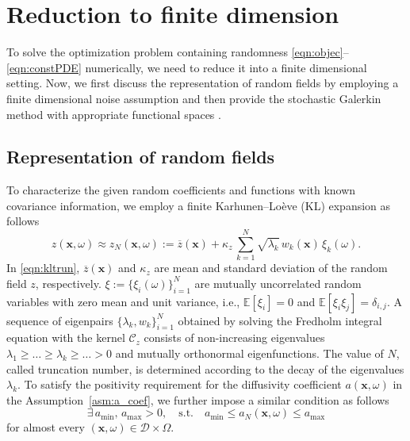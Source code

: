 \documentclass[a4paper,10pt]{article}
\numberwithin{theorem}{section}
\begin{document}


\section{Reduction to finite dimension}\label{sec:finite_dimension} 

To solve the optimization problem containing randomness \eqref{eqn:objec}--\eqref{eqn:constPDE} numerically, we need to reduce it into a finite dimensional setting. Now, we first discuss the representation of random fields by employing a finite dimensional noise assumption \cite{NWiener_1938a} and then provide  the stochastic Galerkin method with  appropriate functional spaces \cite{IBabuska_RTempone_GEZouraris_2004a}.

\subsection{Representation of random fields}

To characterize the given random coefficients and functions with known covariance information, we employ a finite Karhunen--Lo\`{e}ve (KL) expansion \cite{KKarhunen_1947,MLoeve_1946} as follows 
\begin{equation}\label{eqn:kltrun}
	z(\boldsymbol{x},\omega) \approx z_{N}(\boldsymbol{x},\omega) := \overline{z}(\boldsymbol{x}) + \kappa_{z} \,\sum \limits_{k=1}^{N} \sqrt{\lambda_k}\,w_k(\boldsymbol{x})\,\xi_k(\omega).
\end{equation}
In \eqref{eqn:kltrun}, $\overline{z}(\boldsymbol{x})$ and $\kappa_{z}$ are   mean and standard deviation of the random field $z$, respectively. $\xi:=\{\xi_i(\omega)\}_{i=1}^{N}$ are mutually uncorrelated random variables with zero mean and unit variance, i.e., $\mathbb{E}[\xi_i]=0$ and $\mathbb{E}[\xi_i \xi_j]= \delta_{i,j}$. A sequence of eigenpairs $\{\lambda_k,w_k\}_{i=1}^{N}$ obtained by solving the Fredholm integral equation with the kernel $\mathcal{C}_{z}$ consists of non-increasing eigenvalues $\lambda_1 \geq  \ldots \geq  \lambda_k \geq \ldots >0$ and mutually orthonormal  eigenfunctions. The value of $N$, called truncation number, is determined according to the decay of the eigenvalues $\lambda_k$.  To satisfy the positivity requirement for the diffusivity coefficient $a(\boldsymbol{x},\omega)$ in the Assumption~\ref{asm:a_coef},  we further impose a similar condition  as  follows 
\begin{equation}\label{assumption_truncatedD}
  \exists \, a_{\min}, \, a_{\max} >0, \quad \text{s.t.} \quad a_{\min} \leq  a_{N}(\boldsymbol{x},\omega) \leq a_{\max}
\end{equation}
for almost every  $(\boldsymbol{x},\omega) \in  \mathcal{D} \times \Omega$.
\end{document}
